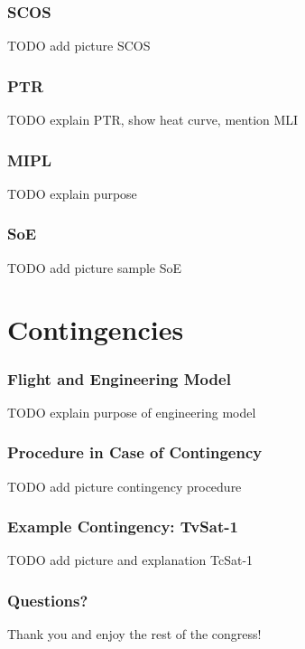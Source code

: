 \documentclass[12pt,utf8,notheorems,compress]{beamer}
\begin{document}
\begin{frame}
  \frametitle{SCOS}
  \pause
  TODO add picture SCOS
\end{frame}

\begin{frame}
  \frametitle{PTR}
  \pause
  TODO explain PTR, show heat curve, mention MLI
\end{frame}

\begin{frame}
  \frametitle{MIPL}
  \pause
  TODO explain purpose
\end{frame}

\begin{frame}
  \frametitle{SoE}
  \pause
  TODO add picture sample SoE
\end{frame}

\section{Contingencies}

\begin{frame}
  \frametitle{Flight and Engineering Model}
  \pause
  TODO explain purpose of engineering model
\end{frame}

\begin{frame}
  \frametitle{Procedure in Case of Contingency}
  \pause
  TODO add picture contingency procedure
\end{frame}

\begin{frame}
  \frametitle{Example Contingency: TvSat-1}
  \pause
  TODO add picture and explanation TcSat-1
\end{frame}





%     


\begin{frame}
  \frametitle{Questions?}
  \vfill
  \begin{center}
    \Large Thank you and enjoy the rest of the congress!
  \end{center}
  \vfill
\end{frame}
\end{document}
